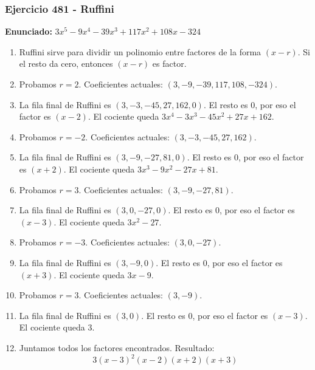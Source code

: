 \documentclass[11pt,a4paper]{article}
\begin{document}
\subsubsection*{Ejercicio 481 - Ruffini}
\textbf{Enunciado:} $ 3 x^{5} - 9 x^{4} - 39 x^{3} + 117 x^{2} + 108 x - 324 $\par
\begin{enumerate}[leftmargin=2em]
\item Ruffini sirve para dividir un polinomio entre factores de la forma \((x-r)\). Si el resto da cero, entonces \((x-r)\) es factor.
\item Probamos \(r=2\). Coeficientes actuales: \((3, -9, -39, 117, 108, -324)\).
\item La fila final de Ruffini es \((3, -3, -45, 27, 162, 0)\). El resto es \(0\), por eso el factor es \((x-2)\). El cociente queda \(3 x^{4} - 3 x^{3} - 45 x^{2} + 27 x + 162\).
\item Probamos \(r=-2\). Coeficientes actuales: \((3, -3, -45, 27, 162)\).
\item La fila final de Ruffini es \((3, -9, -27, 81, 0)\). El resto es \(0\), por eso el factor es \((x+2)\). El cociente queda \(3 x^{3} - 9 x^{2} - 27 x + 81\).
\item Probamos \(r=3\). Coeficientes actuales: \((3, -9, -27, 81)\).
\item La fila final de Ruffini es \((3, 0, -27, 0)\). El resto es \(0\), por eso el factor es \((x-3)\). El cociente queda \(3 x^{2} - 27\).
\item Probamos \(r=-3\). Coeficientes actuales: \((3, 0, -27)\).
\item La fila final de Ruffini es \((3, -9, 0)\). El resto es \(0\), por eso el factor es \((x+3)\). El cociente queda \(3 x - 9\).
\item Probamos \(r=3\). Coeficientes actuales: \((3, -9)\).
\item La fila final de Ruffini es \((3, 0)\). El resto es \(0\), por eso el factor es \((x-3)\). El cociente queda \(3\).
\item Juntamos todos los factores encontrados. Resultado: \[\boxed{3 \left(x - 3\right)^{2} \left(x - 2\right) \left(x + 2\right) \left(x + 3\right)}\]
\end{enumerate}

\vspace{0.2cm}
\end{document}
